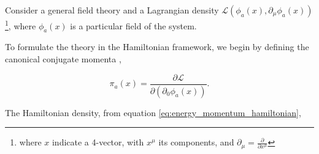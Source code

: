 \documentclass[11pt,a4paper,twoside,pdf]{article}
\numberwithin{equation}{section}
\begin{document}

Consider a general field theory and a Lagrangian density 
$\mathcal{L}(\phi_a (x),\partial_\mu\phi_a (x))$\footnote{where $x$ indicate a 
4-vector, with $x^\mu$ its components, and $\partial_\mu = \frac{\partial}
{\partial x^\mu}$}, where $\phi_a (x)$ is a particular field of the system.

To formulate the theory in the Hamiltonian framework, we begin by 
defining the canonical conjugate momenta \cite{Peskin:1995ev},

\begin{equation}
    \pi_a (x) = \frac{\partial \mathcal{L}}{\partial (\partial_0 \phi_a (x))}.
\end{equation}

The Hamiltonian density, from equation \eqref{eq:energy_momentum_hamiltonian},
\end{document}
